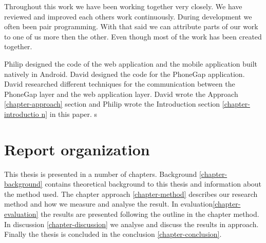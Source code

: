 Throughout this work we have been working together very closely. We have reviewed and improved each others work continuously. During development we often been pair programming. With that said we can attribute parts of our work to one of us more then the other. Even though most of the work has been created together. 

Philip designed the code of the web application and the mobile application built natively in Android. David designed the code for the PhoneGap application. David researched different techniques for the communication between the PhoneGap layer and the web application layer. David wrote the Approach \ref{chapter-approach} section and Philip wrote the Introduction section \ref{chapter-introductio
n} in this paper. 
s
\section{Report organization}\label{section-report-organization}
This thesis is presented in a number of chapters. Background \ref{chapter-background} contains theoretical background to this thesis and information about the method used. The chapter approach \ref{chapter-method} describes our research method and how we measure and analyse the result. In evaluation\ref{chapter-evaluation} the results are presented following the outline in the chapter method. In discussion \ref{chapter-discussion} we analyse and discuss the results in approach. Finally the thesis is concluded in the conclusion \ref{chapter-conclusion}.
